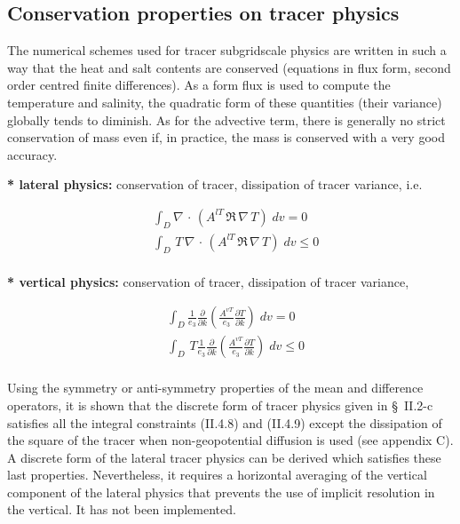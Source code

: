 \documentclass[../main/NEMO_manual]{subfiles}
\begin{document}
\subsection{Conservation properties on tracer physics}
\label{subsec:Invariant_tra_physics}

The numerical schemes used for tracer subgridscale physics are written in such a way that
the heat and salt contents are conserved (equations in flux form, second order centred finite differences).
As a form flux is used to compute the temperature and salinity,
the quadratic form of these quantities (\ie their variance) globally tends to diminish.
As for the advective term, there is generally no strict conservation of mass even if,
in practice, the mass is conserved with a very good accuracy. 

\textbf{* lateral physics: }conservation of tracer, dissipation of tracer 
variance, i.e.

\[
  \begin{aligned}
    &\int_D \nabla\, \cdot\, \left( A^{lT} \,\Re \,\nabla \,T \right)\;dv = 0 \\
    &\int_D \,T\, \nabla\, \cdot\, \left( A^{lT} \,\Re \,\nabla \,T \right)\;dv \leq 0 \\
  \end{aligned}
\]

\textbf{* vertical physics: }conservation of tracer, dissipation of tracer variance, \ie

\[
  \begin{aligned}
    & \int_D \frac{1}{e_3 } \frac{\partial }{\partial k}\left( \frac{A^{vT}}{e_3 }  \frac{\partial T}{\partial k}  \right)\;dv = 0 \\
    & \int_D \,T \frac{1}{e_3 } \frac{\partial }{\partial k}\left( \frac{A^{vT}}{e_3 }  \frac{\partial T}{\partial k}  \right)\;dv \leq 0 \\
  \end{aligned}
\]

Using the symmetry or anti-symmetry properties of the mean and difference operators,
it is shown that the discrete form of tracer physics given in {\S}~II.2-c satisfies all the integral constraints
(II.4.8) and (II.4.9) except the dissipation of the square of the tracer when non-geopotential diffusion is used
(see appendix C).
A discrete form of the lateral tracer physics can be derived which satisfies these last properties.
Nevertheless, it requires a horizontal averaging of the vertical component of the lateral physics that
prevents the use of implicit resolution in the vertical.
It has not been implemented.

\biblio

\pindex
\end{document}
